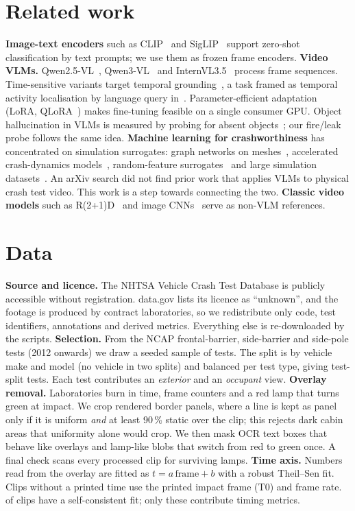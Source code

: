 \documentclass[10pt,twocolumn]{article}
\begin{document}
\section{Related work}
\textbf{Image-text encoders} such as CLIP~\citep{radford2021clip} and SigLIP~\citep{zhai2023siglip,tschannen2025siglip2}
support zero-shot classification by text prompts; we use them as frozen frame encoders.
\textbf{Video VLMs.} Qwen2.5-VL~\citep{bai2025qwen25vl}, Qwen3-VL~\citep{bai2025qwen3vl} and
InternVL3.5~\citep{wang2025internvl35} process frame sequences. Time-sensitive variants
target temporal grounding~\citep{ren2023timechat}, a task framed as temporal activity
localisation by language query in~\citet{gao2017tall}. Parameter-efficient adaptation (LoRA,
QLoRA~\citep{hu2021lora,dettmers2023qlora}) makes fine-tuning feasible on a single consumer GPU.
Object hallucination in VLMs is measured by probing for absent objects~\citep{li2023pope}; our
fire/leak probe follows the same idea.
\textbf{Machine learning for crashworthiness} has concentrated on simulation surrogates:
graph networks on meshes~\citep{pfaff2020meshgraphnets,kneifl2024multihierarchical,li2025gnncrash},
accelerated crash-dynamics models~\citep{nabian2025crashdynamics}, random-feature
surrogates~\citep{herold2022randomfeatures} and large simulation datasets~\citep{elrefaie2026carcrashnet}.
An arXiv search did not find prior work that applies VLMs to physical crash test video. This
work is a step towards connecting the two.
\textbf{Classic video models} such as R(2+1)D~\citep{tran2017r21d} and image CNNs~\citep{he2015resnet}
serve as non-VLM references.

\section{Data}
\textbf{Source and licence.} The NHTSA Vehicle Crash Test Database is publicly accessible
without registration. data.gov lists its licence as ``unknown'', and the footage is produced by
contract laboratories, so we redistribute only code, test identifiers, annotations and derived
metrics. Everything else is re-downloaded by the scripts.
\textbf{Selection.} From the \NCatalog{} NCAP frontal-barrier, side-barrier and side-pole tests
(2012 onwards) we draw a seeded sample of \NTests{} tests. The split is by vehicle make and model
(no vehicle in two splits) and balanced per test type, giving \NTestTests{} test-split tests.
Each test contributes an \emph{exterior} and an \emph{occupant} view.
\textbf{Overlay removal.} Laboratories burn in time, frame counters and a red lamp that turns
green at impact. We crop rendered border panels, where a line is kept as panel only if it is
uniform \emph{and} at least 90\,\% static over the clip; this rejects dark cabin areas that
uniformity alone would crop. We then mask OCR text boxes that behave like overlays and lamp-like
blobs that switch from red to green once. A final check scans every processed clip for surviving
lamps.
\textbf{Time axis.} Numbers read from the overlay are fitted as $t = a\,\mathrm{frame}+b$ with a
robust Theil--Sen fit. Clips without a printed time use the printed impact frame (T0) and frame
rate. \NVerified{} of \NClips{} clips have a self-consistent fit; only these contribute timing
metrics.
\end{document}
